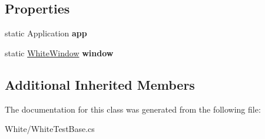 \subsection*{Properties}
\begin{DoxyCompactItemize}
\item 
\hypertarget{class_proto_test_1_1_golem_1_1_white_1_1_white_test_base_aa91926364ada5cd129880dfea121e210}{static Application {\bfseries app}}\label{class_proto_test_1_1_golem_1_1_white_1_1_white_test_base_aa91926364ada5cd129880dfea121e210}

\item 
\hypertarget{class_proto_test_1_1_golem_1_1_white_1_1_white_test_base_a20c6d14cf199c33d3467483401e305f1}{static \hyperlink{class_proto_test_1_1_golem_1_1_white_1_1_elements_1_1_white_window}{White\-Window} {\bfseries window}}\label{class_proto_test_1_1_golem_1_1_white_1_1_white_test_base_a20c6d14cf199c33d3467483401e305f1}

\end{DoxyCompactItemize}
\subsection*{Additional Inherited Members}


The documentation for this class was generated from the following file\-:\begin{DoxyCompactItemize}
\item 
White/White\-Test\-Base.\-cs\end{DoxyCompactItemize}
